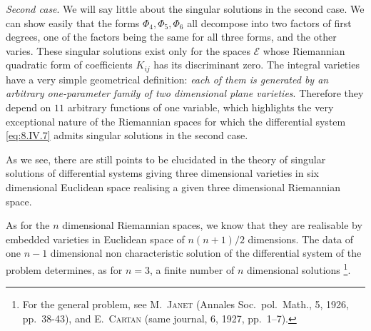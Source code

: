 \documentclass[leqno,11pt]{book}
\numberwithin{equation}{chapter}
\theoremstyle{shape1}
\theoremstyle{shape0}
\theoremstyle{shape2}
\theoremstyle{definition}
\begin{document}
\emph{Second case}. We will say little about the singular solutions in the second case. We can show easily that the forms $\Phi_{4},\Phi_{5},\Phi_{6}$ all decompose into two factors of first degrees, one of the factors being the same for all three forms, and the other varies. These singular solutions exist only for the spaces $\mathcal{E}$ whose Riemannian quadratic form of coefficients $K_{ij}$ has its discriminant zero. The integral varieties have a very simple geometrical definition: \emph{each of them is generated by an arbitrary one-parameter family of two dimensional plane varieties}. Therefore they depend on $11$ arbitrary functions of one variable, which highlights the very exceptional nature of the Riemannian spaces for which the differential system \eqref{eq:8.IV.7} admits singular solutions in the second case.

As we see, there are still points to be elucidated in the theory of singular solutions of differential systems giving three dimensional varieties in six dimensional Euclidean space realising a given three dimensional Riemannian space.

As for the $n$ dimensional Riemannian spaces, we know that they are realisable by embedded varieties in Euclidean space of $n(n+1)/2$ dimensions. The data of one $n-1$ dimensional non characteristic solution of the differential system of the problem determines, as for $n=3$, a finite number of $n$ dimensional solutions \footnote{For the general problem, see \textsc{M.~Janet} (Annales Soc.~pol.~Math., 5, 1926, pp.~38-43), and \textsc{E.~Cartan} (same journal, 6, 1927, pp.~1--7).}.
\end{document}
